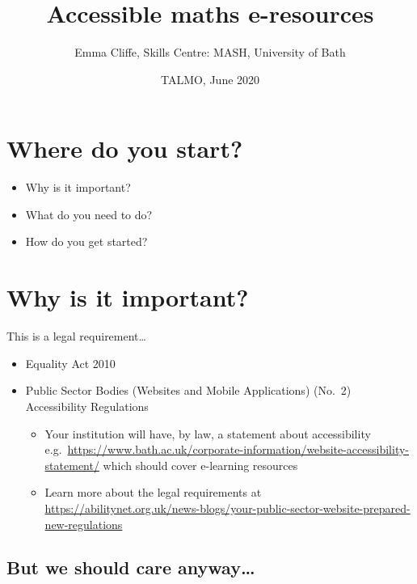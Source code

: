 \documentclass[
  10pt,
  english,
  a4paper]{article}
\title{Accessible maths e-resources}
\author{Emma Cliffe, Skills Centre: MASH, University of Bath}
\date{TALMO, June 2020}
\providecommand{\tightlist}{%
  \setlength{\itemsep}{0pt}\setlength{\parskip}{0pt}}
\theoremstyle{plain}
\theoremstyle{plain}
\theoremstyle{plain}
\theoremstyle{plain}
\theoremstyle{plain}
\theoremstyle{definition}
\theoremstyle{definition}
\theoremstyle{definition}
\theoremstyle{remark}
\begin{document}
\maketitle

{
\setcounter{tocdepth}{2}
\tableofcontents
}
\newpage
{}

\hypertarget{where-do-you-start}{%
\section*{Where do you start?}\label{where-do-you-start}}

\begin{itemize}
\tightlist
\item
  Why is it important?
\item
  What do you need to do?
\item
  How do you get started?
\end{itemize}

\hypertarget{why-is-it-important}{%
\section{Why is it important?}\label{why-is-it-important}}

This is a legal requirement\ldots{}

\begin{itemize}
\tightlist
\item
  Equality Act 2010
\item
  Public Sector Bodies (Websites and Mobile Applications) (No.~2) Accessibility Regulations

  \begin{itemize}
  \tightlist
  \item
    Your institution will have, by law, a statement about accessibility e.g.~\url{https://www.bath.ac.uk/corporate-information/website-accessibility-statement/} which should cover e-learning resources\\
  \item
    Learn more about the legal requirements at \url{https://abilitynet.org.uk/news-blogs/your-public-sector-website-prepared-new-regulations}
  \end{itemize}
\end{itemize}

\hypertarget{but-we-should-care-anyway}{%
\subsection{But we should care anyway\ldots{}}\label{but-we-should-care-anyway}}
\end{document}
